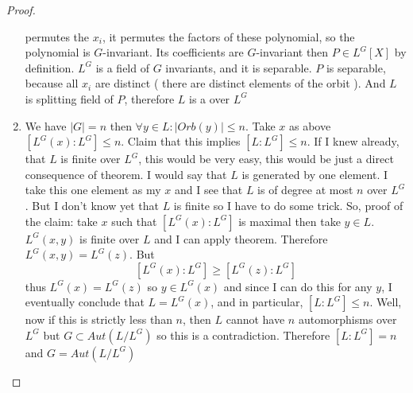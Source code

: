 \begin{theorem}[Artin]
\begin{proof}
\begin{enumerate}
      permutes  the $x_i$, it permutes the factors of these polynomial,
      so the polynomial is $G$-invariant. Its coefficients are
      $G$-invariant then $P \in L^G\left[X\right]$ by definition. $L^G$
      is a field of $G$ invariants, and it is separable. $P$ is separable,
      because all $x_i$ are distinct ( there are distinct elements of the
      orbit ). And $L$ is splitting field of $P$, therefore $L$ is a
       over $L^G$ 
    \item We have $\left|G\right| = n$ then
      $\forall y \in L: \left|Orb\left(y\right)\right| \le n$. Take
      $x$ as above
      $\left[L^G\left(x\right): L^G\right] \le n$. Claim that this
      implies $\left[L:L^G\right] \le n$. If I knew already, that $L$ is
      finite over $L^G$, this would be very easy, this would be just a
      direct consequence of  theorem. I
      would say that $L$ is generated by one element. I take this one element as
      my $x$ and I see that $L$ is of degree at most $n$ over $L^G$. But I
      don't know yet that $L$ is finite so I have to do some trick. So,
      proof of the claim:  take $x$ such that
      $\left[L^G\left(x\right):L^G\right]$ is maximal then take $y \in
      L$. $L^G\left(x,y\right)$ is finite over $L$ and I can apply
       theorem. Therefore
      $L^G\left(x,y\right) = L^G\left(z\right)$. But
      \[
      \left[L^G\left(x\right):L^G\right] \ge
      \left[L^G\left(z\right):L^G\right]
      \]
      thus $L^G\left(x\right) = L^G\left(z\right)$ so
      $y \in L^G\left(x\right)$ and since I can do this for any $y$, I
      eventually conclude that $L = L^G\left(x\right)$, and in
      particular, $\left[L: L^G\right] \le n$. Well, now if this is
      strictly less than $n$, then $L$ cannot have $n$ automorphisms
      over $L^G$ but $G \subset Aut\left(L/L^G\right)$ so this is a
      contradiction. Therefore $\left[L: L^G\right] = n$ and
      $G = Aut\left(L/L^G\right)$
    \end{enumerate}
  \end{proof}
  \label{thm:artin}
\end{theorem}
